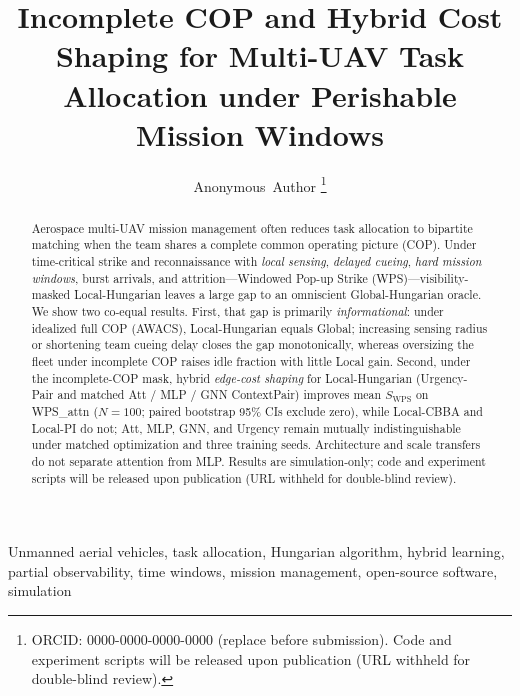 \documentclass[journal,twocolumn,10pt]{IEEEtran}
\begin{document}
\title{Incomplete COP and Hybrid Cost Shaping for Multi-UAV Task Allocation under Perishable Mission Windows}

\author{
  Anonymous~Author
  \thanks{ORCID: 0000-0000-0000-0000 (replace before submission).
  Code and experiment scripts will be released upon publication (URL withheld for double-blind review).}
}

\maketitle

\begin{abstract}
Aerospace multi-UAV mission management often reduces task allocation to bipartite matching when the team shares a complete common operating picture (COP).
Under time-critical strike and reconnaissance with \emph{local sensing}, \emph{delayed cueing}, \emph{hard mission windows}, burst arrivals, and attrition---Windowed Pop-up Strike (WPS)---visibility-masked Local-Hungarian leaves a large gap to an omniscient Global-Hungarian oracle.
We show two co-equal results.
First, that gap is primarily \emph{informational}: under idealized full COP (AWACS), Local-Hungarian equals Global; increasing sensing radius or shortening team cueing delay closes the gap monotonically, whereas oversizing the fleet under incomplete COP raises idle fraction with little Local gain.
Second, under the incomplete-COP mask, hybrid \emph{edge-cost shaping} for Local-Hungarian (Urgency-Pair and matched Att / MLP / GNN ContextPair) improves mean \(S_{\mathrm{WPS}}\) on WPS\_attn (\(N{=}100\); paired bootstrap 95\% CIs exclude zero), while Local-CBBA and Local-PI do not; Att, MLP, GNN, and Urgency remain mutually indistinguishable under matched optimization and three training seeds.
Architecture and scale transfers do not separate attention from MLP.
Results are simulation-only; code and experiment scripts will be released upon publication (URL withheld for double-blind review).
\end{abstract}

\begin{IEEEkeywords}
Unmanned aerial vehicles, task allocation, Hungarian algorithm, hybrid learning, partial observability, time windows, mission management, open-source software, simulation
\end{IEEEkeywords}
\end{document}
